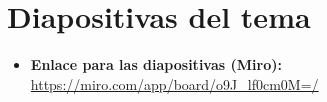 \documentclass[letterpaper, 12pt]{article}
\begin{document}
    \newpage
    \lhead{}
    \printbibliography
    \section*{Diapositivas del tema}
    \justify
    \begin{itemize}
        \item \textbf{Enlace para las diapositivas (Miro):} \url{https://miro.com/app/board/o9J_lf0cm0M=/}
    \end{itemize}
    
\end{document}
